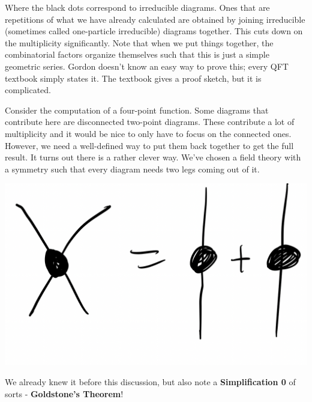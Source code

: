 Where the black dots correspond to irreducible diagrams. Ones that are repetitions of what we have already calculated are obtained by joining irreducible (sometimes called one-particle irreducible) diagrams together. This cuts down on the multiplicity significantly. Note that when we put things together, the combinatorial factors organize themselves such that this is just a simple geometric series. Gordon doesn't know an easy way to prove this; every QFT textbook simply states it. The textbook gives a proof sketch, but it is complicated.

Consider the computation of a four-point function. Some diagrams that contribute here are disconnected two-point diagrams. These contribute a lot of multiplicity and it would be nice to only have to focus on the connected ones. However, we need a well-defined way to put them back together to get the full result. It turns out there is a rather clever way. We've chosen a field theory with a symmetry such that every diagram needs two legs coming out of it.

\begin{center}
    \includegraphics[scale=0.3]{Images/fig-lec27feynman5.png}
\end{center}

We already knew it before this discussion, but also note a \textbf{Simplification 0} of sorts - \textbf{Goldstone's Theorem}!

